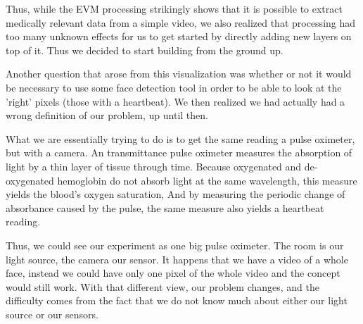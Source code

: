 \documentclass[12pt]{article}
\begin{document}
  Thus, while the EVM processing strikingly shows that it is possible to extract medically relevant data from a simple video, we also realized that processing had too many 
  unknown effects for us to get started by directly adding new layers on top of it. Thus we decided to start building from the ground up.

  Another question that arose from this visualization was whether or not it would be necessary to use some face detection tool 
  in order to be able to look at the 'right' pixels (those with a heartbeat). We then realized we had actually 
  had a wrong definition of our problem, up until then.

  What we are essentially trying to do is to get the same reading a pulse oximeter, but with a camera.
  An transmittance pulse oximeter measures the absorption of light by a thin layer of 
  tissue through time. Because oxygenated and de-oxygenated hemoglobin do not absorb light 
  at the same wavelength, this measure yields the blood's oxygen saturation, And by measuring the 
  periodic change of absorbance caused by the pulse, the same measure also yields a heartbeat reading.

  Thus, we could see our experiment as one big pulse oximeter. The room is our light source, 
  the camera our sensor. It happens that we have a video of a whole face, instead we could 
  have only one pixel of the whole video and the concept would still work. 
  With that different view, our problem changes, and the difficulty comes from the 
  fact that we do not know much about either our light source or our sensors.

\end{document}
